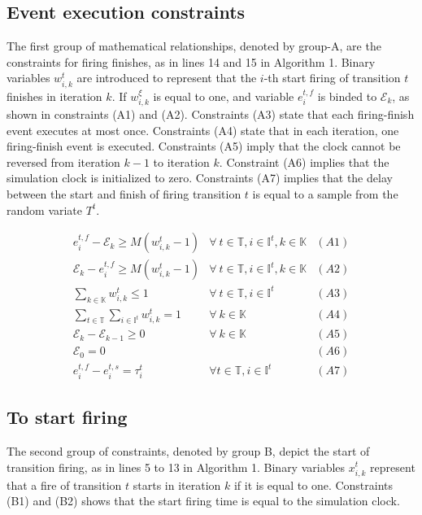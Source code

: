 \documentclass[suppldata]{interact}
\theoremstyle{plain}
\theoremstyle{definition}
\theoremstyle{remark}
\begin{document}
\subsection{Event execution constraints}

The first group of mathematical relationships, denoted by group-A, are the constraints for firing finishes, as in lines 14 and 15 in Algorithm 1. Binary variables $w^{t}_{i,k}$ are introduced to represent that the $i$-th start firing of transition $t$ finishes in iteration $k$. If $w^{\xi}_{i,k}$ is equal to one, and variable $e^{t,f}_{i}$ is binded to $\mathcal{E}_k$, as shown in constraints (A1) and (A2). Constraints (A3) state that each firing-finish event executes at most once. Constraints (A4) state that in each iteration, one  firing-finish event is executed. Constraints (A5) imply that the clock cannot be reversed from iteration $k-1$ to iteration $k$. Constraint (A6) implies that the simulation clock is initialized to zero. Constraints (A7) implies that the delay between the start and finish of firing transition $t$ is equal to a sample from the random variate $T^{t}$.

\begin{eqnarray}
	e^{t,f}_i-\mathcal{E}_k\ge M(w^{t}_{i,k}-1) & \forall\ t\in\mathbb{T},i\in \mathbb{I}^{t},k\in \mathbb{K}&(A1)\nonumber\\
	\mathcal{E}_k-e^{t,f}_i\ge M(w^{t}_{i,k}-1) & \forall\ t\in\mathbb{T},i\in \mathbb{I}^{t},k\in \mathbb{K}&(A2)\nonumber\\
	\sum_{k\in \mathbb{K}} w^{t}_{i,k} \le 1& \forall\ t\in\mathbb{T},i\in \mathbb{I}^{t}&(A3)\nonumber\\
	\sum_{t\in \mathbb{T}}\sum_{i\in \mathbb{I}^{t}} w^{t}_{i,k} =1&\forall\ k\in \mathbb{K}&(A4)\nonumber\\
	\mathcal{E}_{k}-\mathcal{E}_{k-1}\ge 0&\forall\ k\in \mathbb{K}&(A5)\nonumber\\
	\mathcal{E}_0 = 0&&(A6)\nonumber\\
	e^{t,f}_{i} - e^{t,s}_{i} = \tau^{t}_{i} & \forall t\in\mathbb{T}, i\in \mathbb{I}^{t}&(A7) \nonumber
\end{eqnarray}


\subsection{To start firing} \label{sec:MPR_start_Firing}

The second group of constraints, denoted by group B, depict the start of transition firing, as in lines 5 to 13 in Algorithm 1. Binary variables $x^{t}_{i,k}$ represent that a fire of transition $t$ starts in iteration $k$ if it is equal to one. Constraints (B1) and (B2) shows that the start firing time is equal to the simulation clock.
\end{document}
